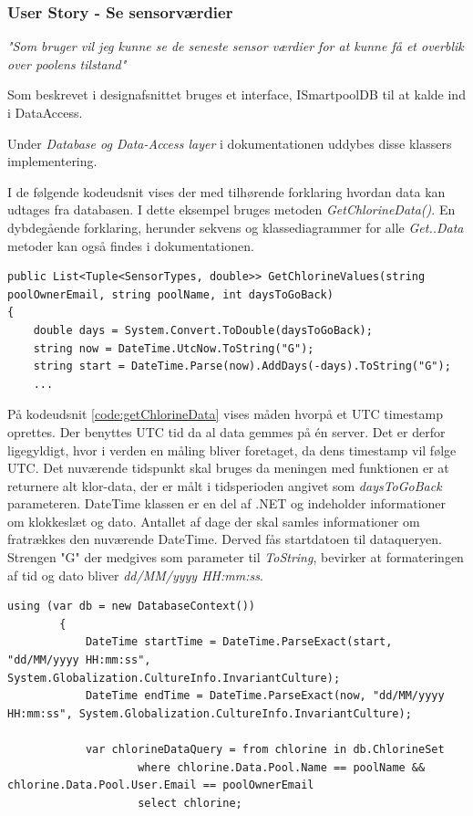 \subsubsection{User Story - Se sensorværdier}

\textit{"Som bruger vil jeg kunne se de seneste sensor værdier for at kunne få et overblik over poolens tilstand"}\

Som beskrevet i designafsnittet bruges et interface, ISmartpoolDB til at kalde ind i DataAccess. 

Under \textit{Database og Data-Access layer} i dokumentationen uddybes disse klassers implementering.

I de følgende kodeudsnit vises der med tilhørende forklaring hvordan data kan udtages fra databasen. I dette eksempel bruges metoden \textit{GetChlorineData()}. En dybdegående forklaring, herunder sekvens og klassediagrammer for alle \textit{Get..Data} metoder kan også findes i dokumentationen.

\begin{lstlisting}[caption=GetChlorineData metoden - konvertering af DateTime objekter, label=code:getChlorineData]
public List<Tuple<SensorTypes, double>> GetChlorineValues(string poolOwnerEmail, string poolName, int daysToGoBack)
{
	double days = System.Convert.ToDouble(daysToGoBack);
	string now = DateTime.UtcNow.ToString("G");
	string start = DateTime.Parse(now).AddDays(-days).ToString("G");
	...
\end{lstlisting}

På kodeudsnit \ref{code:getChlorineData} vises måden hvorpå et UTC timestamp oprettes. Der benyttes UTC tid da al data gemmes på én server. Det er derfor ligegyldigt, hvor i verden en måling bliver foretaget, da dens timestamp vil følge UTC. Det nuværende tidspunkt skal bruges da meningen med funktionen er at returnere alt klor-data, der er målt i tidsperioden angivet som \textit{daysToGoBack} parameteren. DateTime \cite{dotnetdatetime} klassen er en del af .NET og indeholder informationer om klokkeslæt og dato. Antallet af dage der skal samles informationer om fratrækkes den nuværende DateTime. Derved fås startdatoen til dataqueryen. Strengen "G" der medgives som parameter til \textit{ToString}, bevirker at formateringen af tid og dato bliver \textit{dd/MM/yyyy HH:mm:ss}.

\begin{lstlisting}[caption=Konvertering tilbage til DateTime objekter,label=code:convertToDateTime]
using (var db = new DatabaseContext())
		{   
			DateTime startTime = DateTime.ParseExact(start, "dd/MM/yyyy HH:mm:ss", System.Globalization.CultureInfo.InvariantCulture);
			DateTime endTime = DateTime.ParseExact(now, "dd/MM/yyyy HH:mm:ss", System.Globalization.CultureInfo.InvariantCulture);

			var chlorineDataQuery = from chlorine in db.ChlorineSet
					where chlorine.Data.Pool.Name == poolName && chlorine.Data.Pool.User.Email == poolOwnerEmail
					select chlorine;

\end{lstlisting}

